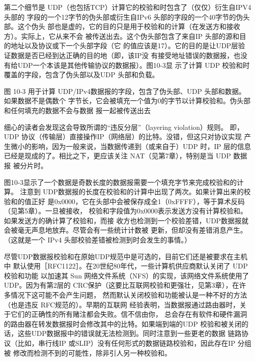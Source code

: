 第二个细节是 UDP（也包括TCP）计算它的校验和时包含了（仅仅）衍生自IPV4头部的
字段的一个12字节的伪头部或衍生自IPv6 头部的字段的一个40字节的伪头部。这个伪头
部也是虚的，它的目的只是用于校验和的计算（在发送方和接收方）。实际上，它从来不会
被传送出去。这个伪头部包含了来自IP 头部的源和目的地址以及协议或下一个头部字段（它
的值应该是17）。它的目的是让UDP层验证数据是否已经到达正确的目的地（即，该IP没
有接受地址错误的数据报，也没有给UDP一个本该是其他传输协议的数据报）。图10-3显
示了计算 UDP 校验和时覆盖的字段，包含了伪头部以及UDP 头部和负载。

图 10-3 用于计算 UDP/IPv4数据报的字段，包含了伪头部、UDP 头部和数据。如果数据不是偶数个
字节长，它会被填充一个值为0的字节以计算校验和。伪头部和任何填充的数据不会与数据
报一起被传送出去


\begin{tcolorbox}    
    细心的读者会发现这会导致所谓的“违反分层”（layering violation）规则。
    即，UDP 协议（传输层）直接操作IP（网络层）的比特。没错，但这只对协议实现
    产生微小的影响，因为一般来说，当数据传递到（或来自于）UDP 时，IP 层的信息
    已经是现成的了。相比之下，更应该关注 NAT（见第7章），特别是当 UDP 数据报
    被分片时。
\end{tcolorbox}

图10-3显示了一个数据是奇数长度的数据报需要一个填充字节来完成校验和的计算。
注意到 UDP数据报的长度在校验和的计算中出现了两次。如果计算出来的校验和的值正好
是0x0000，它在头部中会被保存成全1（0xFFFF），等于算术反码（见第5章）。一旦被接收，
校验和字段值为0x0000表示发送方没有计算校验和。如果发送方的确计算了校验和，而接
收方也检测到一个校验差错，UDP数据报就会被毫无声息地放弃。尽管会有一些统计计数被
更新，但却没有差错消息产生。（这就是一个 IPv4 头部校验差错被检测到时会发生的事情。）

尽管UDP数据报校验和在原始UDP规范中是可选的，目前它们还是被要求在主机中
默认使用［RFC1122］。在20世纪80年代，一些计算机供应商默认关闭了 UDP校验和功能
以加速其 Sun 网络文件系统（NFS）的实现，该网络文件系统使用了 UDP。因为有第2层的
CRC保护（这要比互联网校验和更强壮，见第3章），在许多情况下这可能不会产生问题，
然而默认关闭校验和功能被认是一种不好的方法（也是违反 RFC规范的）。早期的互联网
经验表明，当数据报通过路由器时，关于它们的正确性的所有赌注都会失败。信不信由你，
总会存在有软件和硬件漏洞的路由器在转发数据报时会修改其中的比特。如果端到端的UDP
校验和被关闭的话，这些UDP数据报中的错误就无法检测到。同时注意到一些更老的数据
链路协议（比如，串行线IP 或SLIP）没有任何形式的数据链路校验和，因此存在IP 分组被
修改而检测不到的可能性，除非引人另一种校验和。

